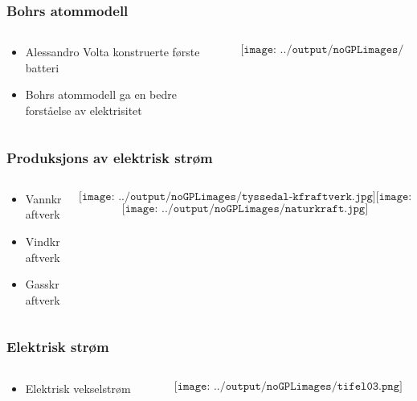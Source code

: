 \documentclass[aspectratio=169,xcolor=dvipsnames]{beamer}
\begin{document}
\begin{frame}
	\frametitle{Bohrs atommodell}

	\begin{columns}
		\begin{column}{0.5\textwidth}
			\begin{itemize}
				\item Alessandro Volta konstruerte første batteri
				\item Bohrs atommodell ga en bedre forståelse av elektrisitet
			\end{itemize}
		\end{column}

		\begin{column}{0.5\textwidth}
			$$\texttt{[image: ../output/noGPLimages/tifel02.png]}$$
		\end{column}
	\end{columns}
\end{frame}
\begin{frame}
	\frametitle{Produksjons av elektrisk strøm}

	\begin{columns}
		\begin{column}{0.333\textwidth}
			\begin{itemize}
				\item Vannkraftverk
				\item Vindkraftverk
				\item Gasskraftverk
			\end{itemize}
		\end{column}

		\begin{column}{0.7\textwidth}
			$$\texttt{[image: ../output/noGPLimages/tyssedal-kfraftverk.jpg]}\texttt{[image: ../output/noGPLimages/vindkraft.jpg]}$$
			$$\texttt{[image: ../output/noGPLimages/naturkraft.jpg]}$$
		\end{column}
	\end{columns}
\end{frame}

\begin{frame}
	\frametitle{Elektrisk strøm}

	\begin{columns}
		\begin{column}{0.5\textwidth}
			\begin{itemize}
				\item Elektrisk vekselstrøm
			\end{itemize}
		\end{column}

		\begin{column}{0.5\textwidth}
			$$\texttt{[image: ../output/noGPLimages/tifel03.png]}$$
		\end{column}
	\end{columns}
\end{frame}
\end{document}
